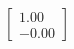\documentclass[preview]{standalone}
\begin{document}
\begin{align*}
\begin{bmatrix} 1.00 \\ -0.00 \end{bmatrix}
\end{align*}
\end{document}
